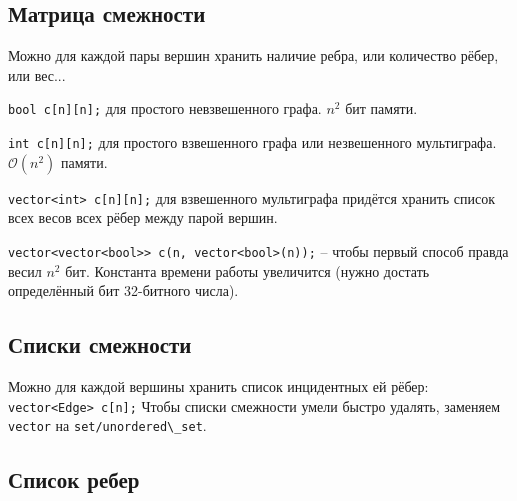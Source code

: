\subsection*{Матрица смежности}

Можно для каждой пары вершин хранить наличие ребра, или количество рёбер, или вес...

\lstinline!bool c[n][n];! для простого невзвешенного графа. $n^2$ бит памяти.

\lstinline!int c[n][n];! для простого взвешенного графа или незвешенного мультиграфа. $\mathcal{O}(n^2)$ памяти.

\lstinline!vector<int> c[n][n];! для взвешенного мультиграфа придётся хранить список всех весов всех рёбер между парой вершин.

\lstinline!vector<vector<bool>> c(n, vector<bool>(n));! – чтобы первый способ правда весил $n^2$ бит. Константа времени работы увеличится (нужно достать определённый бит 32-битного числа).

\subsection*{Списки смежности}

Можно для каждой вершины хранить список инцидентных ей рёбер: \lstinline!vector<Edge> c[n];!
Чтобы списки смежности умели быстро удалять, заменяем \lstinline!vector! на \lstinline!set/unordered\_set!.

\subsection*{Список ребер}

